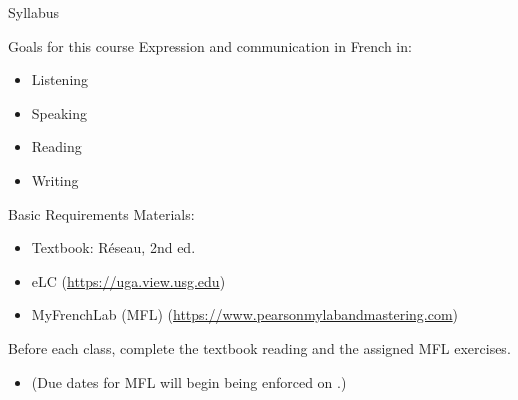 \begin{frame}
  \begin{center}
    \Huge{Syllabus}
  \end{center}
\end{frame}

\begin{frame}{Goals for this course}
  Expression and communication in French in:
  \begin{itemize}
    \item Listening
    \item Speaking
    \item Reading
    \item Writing
  \end{itemize}
\end{frame}

\begin{frame}{Basic Requirements}
  Materials:
  \begin{itemize}
    \item Textbook: Réseau, 2nd ed.
    \item eLC (\url{https://uga.view.usg.edu})
    \item MyFrenchLab (MFL) (\url{https://www.pearsonmylabandmastering.com})
  \end{itemize}
  \alert{Before each class}, complete the textbook reading and the assigned MFL exercises.
  \begin{itemize}
    \item (Due dates for MFL will begin being enforced on \mflDue{}.)
  \end{itemize}
\end{frame}

